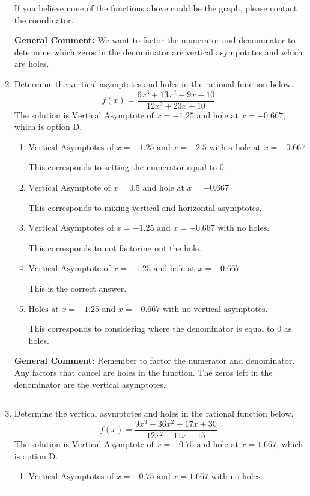 \documentclass{extbook}[14pt]
\newcommand{\litem}[1]{\item #1

\rule{\textwidth}{0.4pt}}
\begin{document}
\begin{enumerate}
{\begin{enumerate}[label=\Alph*.]
If you believe none of the functions above could be the graph, please contact the coordinator.
\end{enumerate}

\textbf{General Comment:} We want to factor the numerator and denominator to determine which zeros in the denominator are vertical asympototes and which are holes.
}
\litem{
Determine the vertical asymptotes and holes in the rational function below.
\[ f(x) = \frac{6x^{3} +13 x^{2} -9 x -10}{12x^{2} +23 x + 10} \]The solution is \( \text{Vertical Asymptote of } x = -1.25 \text{ and hole at } x = -0.667 \), which is option D.\begin{enumerate}[label=\Alph*.]
\item \( \text{Vertical Asymptotes of } x = -1.25 \text{ and } x = -2.5 \text{ with a hole at } x = -0.667 \)

This corresponds to setting the numerator equal to 0.
\item \( \text{Vertical Asymptote of } x = 0.5 \text{ and hole at } x = -0.667 \)

This corresponds to mixing vertical and horizontal asymptotes.
\item \( \text{Vertical Asymptotes of } x = -1.25 \text{ and } x = -0.667 \text{ with no holes.} \)

This corresponds to not factoring out the hole.
\item \( \text{Vertical Asymptote of } x = -1.25 \text{ and hole at } x = -0.667 \)

This is the correct answer.
\item \( \text{Holes at } x = -1.25 \text{ and } x = -0.667 \text{ with no vertical asymptotes.} \)

This corresponds to considering where the denominator is equal to 0 as holes.
\end{enumerate}

\textbf{General Comment:} Remember to factor the numerator and denominator. Any factors that cancel are holes in the function. The zeros left in the denominator are the vertical asymptotes.
}
\litem{
Determine the vertical asymptotes and holes in the rational function below.
\[ f(x) = \frac{9x^{3} -36 x^{2} +17 x + 30}{12x^{2} -11 x -15} \]The solution is \( \text{Vertical Asymptote of } x = -0.75 \text{ and hole at } x = 1.667 \), which is option D.\begin{enumerate}[label=\Alph*.]
\item \( \text{Vertical Asymptotes of } x = -0.75 \text{ and } x = 1.667 \text{ with no holes.} \)


\end{enumerate}}
\end{enumerate}
\end{document}
